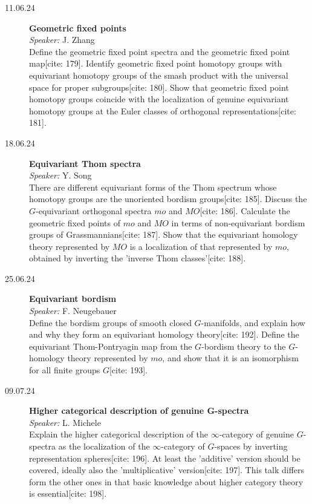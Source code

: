 \documentclass[11pt, openany]{book} %
\begin{document}
\begin{description}
\item[11.06.24] \textbf{Geometric fixed points} \\
\textit{Speaker:} J. Zhang \\
Define the geometric fixed point spectra and the geometric fixed point map[cite: 179]. Identify geometric fixed point homotopy groups with equivariant homotopy groups of the smash product with the universal space for proper subgroups[cite: 180]. Show that geometric fixed point homotopy groups coincide with the localization of genuine equivariant homotopy groups at the Euler classes of orthogonal representations[cite: 181].

\item[18.06.24] \textbf{Equivariant Thom spectra} \\
\textit{Speaker:} Y. Song \\
There are different equivariant forms of the Thom spectrum whose homotopy groups are the unoriented bordism groups[cite: 185]. Discuss the $G$-equivariant orthogonal spectra $mo$ and $MO$[cite: 186]. Calculate the geometric fixed points of $mo$ and $MO$ in terms of non-equivariant bordism groups of Grassmannians[cite: 187]. Show that the equivariant homology theory represented by $MO$ is a localization of that represented by $mo$, obtained by inverting the 'inverse Thom classes'[cite: 188].

\item[25.06.24] \textbf{Equivariant bordism} \\
\textit{Speaker:} F. Neugebauer \\
Define the bordism groups of smooth closed $G$-manifolds, and explain how and why they form an equivariant homology theory[cite: 192]. Define the equivariant Thom-Pontryagin map from the $G$-bordism theory to the $G$-homology theory represented by $mo$, and show that it is an isomorphism for all finite groups $G$[cite: 193].

\item[09.07.24] \textbf{Higher categorical description of genuine G-spectra} \\
\textit{Speaker:} L. Michele \\
Explain the higher categorical description of the $\infty$-category of genuine $G$-spectra as the localization of the $\infty$-category of $G$-spaces by inverting representation spheres[cite: 196]. At least the 'additive' version should be covered, ideally also the 'multiplicative' version[cite: 197]. This talk differs form the other ones in that basic knowledge about higher category theory is essential[cite: 198].

\end{description}
\end{document}
